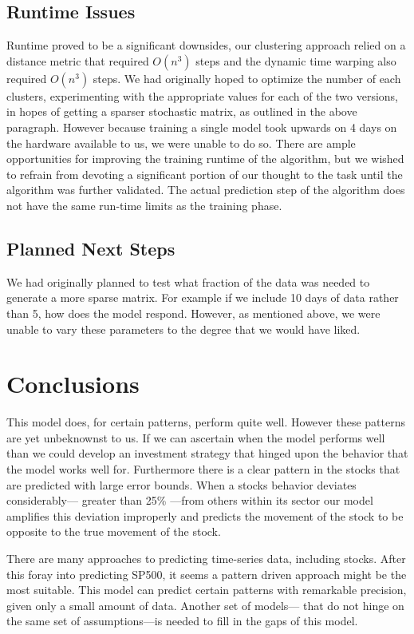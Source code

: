 \documentclass{article}
\begin{document}
\subsection{Runtime Issues}
Runtime proved to be a significant downsides, our clustering approach relied on a distance metric that required $O(n^3)$ steps and the dynamic time warping also required $O(n^3)$ steps. We had originally hoped to optimize the number of each clusters, experimenting with the appropriate values for each of the two versions, in hopes of getting a sparser stochastic matrix, as outlined in the above paragraph. However because training a single model took upwards on 4 days on the hardware available to us, we were unable to do so. There are ample opportunities for improving the training runtime of the algorithm, but we wished to refrain from devoting a significant portion of our thought to the task until the algorithm was further validated. The actual prediction step of the algorithm does not have the same run-time limits as the training phase.

\subsection{Planned Next Steps}
We had originally planned to test what fraction of the data was needed to generate a more sparse matrix. For example if we include 10 days of data rather than 5, how does the model respond. However, as mentioned above, we were unable to vary these parameters to the degree that we would have liked. 
\section{Conclusions}
This model does, for certain patterns, perform quite well. However these patterns are yet unbeknownst to us. If we can ascertain when the model performs well than we could develop an investment strategy that hinged upon the behavior that the model works well for. Furthermore there is a clear pattern in the stocks that are predicted with large error bounds. When a stocks behavior deviates considerably— greater than 25\% —from others within its sector our model amplifies this deviation improperly and predicts the movement of the stock to be opposite to the true movement of the stock. 

There are many approaches to predicting time-series data, including stocks. After this foray into predicting SP500, it seems a pattern driven approach might be the most suitable. This model can predict certain patterns with remarkable precision, given only a small amount of data. Another set of models— that do not hinge on the same set of assumptions—is needed to fill in the gaps of this model. 
\end{document}
